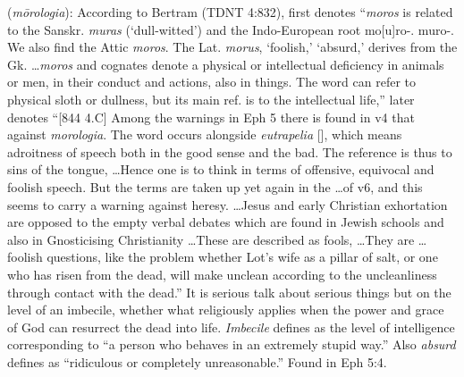 \item[Absurd speech,]

(\textit{mōrologia}):
According to Bertram (TDNT 4:832),  first denotes ``\emph{moros} is related to the Sanskr. \emph{muras} (`dull-witted') and the Indo-European root mo[u]ro-. muro-. We also find the Attic \emph{moros}. The Lat. \emph{morus}, `foolish,' `absurd,' derives from the Gk. \ldots \emph{moros} and cognates denote a physical or intellectual deficiency in animals or men, in their conduct and actions, also in things. The word can refer to physical sloth or dullness, but its main ref. is to the intellectual life,'' later  denotes ``[844 4.C] Among the warnings in Eph 5 there is found in v4 that against \emph{morologia}. The word occurs alongside \emph{eutrapelia} [], which means adroitness of speech both in the good sense and the bad. The reference is thus to sins of the tongue, \ldots Hence one is to think in terms of offensive, equivocal and foolish speech. But the terms are taken up yet again in the \ldots of v6, and this seems to carry a warning against heresy. \ldots Jesus and early Christian exhortation are opposed to the empty verbal debates which are found in Jewish schools and also in Gnosticising Christianity \ldots These are described as fools, \ldots They are \ldots foolish questions, like the problem whether Lot's wife as a pillar of salt, or one who has risen from the dead, will make unclean according to the uncleanliness through contact with the dead.'' It is serious talk about serious things but on the level of an imbecile, whether what religiously applies when the power and grace of God can resurrect the dead into life. \emph{Imbecile} defines as the level of intelligence corresponding to ``a person who behaves in an extremely stupid way.'' Also \emph{absurd} defines as ``ridiculous or completely unreasonable.''
Found in Eph 5:4.
